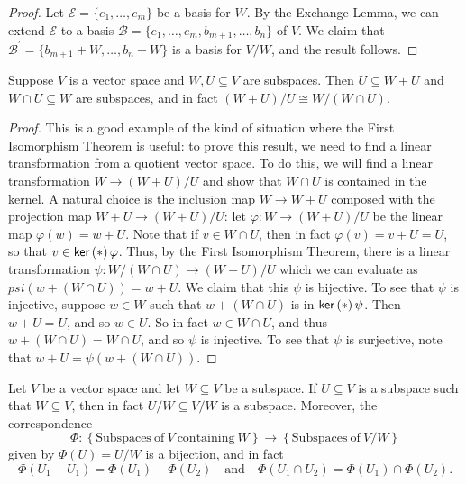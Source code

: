 \documentclass{memoir}
\begin{document}
\begin{proof}
Let $\mathcal{E} = \{e_1,\ldots,e_m\}$ be a basis for $W$. By the Exchange Lemma, we can extend $\mathcal{E}$ to a basis $\mathcal{B} = \{e_1,\ldots,e_m,b_{m+1},\ldots,b_n\}$ of $V$. We claim that $\mathcal{B}^\prime = \{b_{m+1} + W, \ldots, b_n + W\}$ is a basis for $V/W$, and the result follows.
\end{proof}

\begin{prp}
Suppose $V$ is a vector space and $W,U \subseteq V$ are subspaces. Then $U \subseteq W + U$ and $W \cap U \subseteq W$ are subspaces, and in fact $(W+U)/U \cong W/(W \cap U)$.
\end{prp}

\begin{proof}
This is a good example of the kind of situation where the First Isomorphism Theorem is useful: to prove this result, we need to find a linear transformation from a quotient vector space. To do this, we will find a linear transformation $W \rightarrow (W+U)/U$ and show that $W \cap U$ is contained in the kernel. A natural choice is the inclusion map $W \rightarrow W+U$ composed with the projection map $W+U \rightarrow (W+U)/U$: let $\varphi : W \rightarrow (W+U)/U$ be the linear map $\varphi(w) = w + U$. Note that if $v \in W \cap U$, then in fact $\varphi(v) = v+U = U$, so that $v \in \operatorname{\mathsf{ker}}\left(*\right){\varphi}$. Thus, by the First Isomorphism Theorem, there is a linear transformation $\psi : W/(W \cap U) \rightarrow (W+U)/U$ which we can evaluate as $psi(w+(W \cap U)) = w+U$. We claim that this $\psi$ is bijective. To see that $\psi$ is injective, suppose $w \in W$ such that $w+(W \cap U)$ is in $\operatorname{\mathsf{ker}}\left(*\right){\psi}$. Then $w+U = U$, and so $w \in U$. So in fact $w \in W \cap U$, and thus $w+(W \cap U) = W \cap U$, and so $\psi$ is injective. To see that $\psi$ is surjective, note that $w+U = \psi(w+(W \cap U))$.
\end{proof}

\begin{prp}
Let $V$ be a vector space and let $W \subseteq V$ be a subspace. If $U \subseteq V$ is a subspace such that $W \subseteq V$, then in fact $U/W \subseteq V/W$ is a subspace. Moreover, the correspondence \[ \Phi : \left\{ \mathrm{Subspaces\ of}\ V\ \mathrm{containing}\ W \right\} \rightarrow \left\{ \mathrm{Subspaces\ of}\ V/W \right\} \] given by $\Phi(U) = U/W$ is a bijection, and in fact \[\Phi(U_1+U_1) = \Phi(U_1)+\Phi(U_2) \quad \mathrm{and} \quad \Phi(U_1 \cap U_2) = \Phi(U_1) \cap \Phi(U_2).\]
\end{prp}
\end{document}
